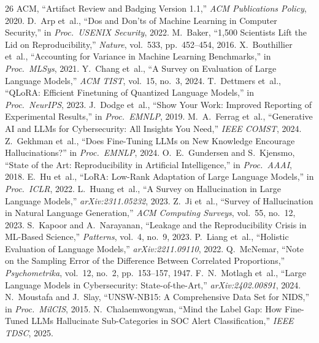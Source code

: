 \documentclass[review,3p]{elsarticle}
\begin{document}
\begin{thebibliography}{26}
 ACM, ``Artifact Review and Badging Version 1.1,'' \emph{ACM Publications Policy}, 2020.
 D.~Arp et~al., ``Dos and Don'ts of Machine Learning in Computer Security,'' in \emph{Proc.\ USENIX Security}, 2022.
 M.~Baker, ``1,500 Scientists Lift the Lid on Reproducibility,'' \emph{Nature}, vol.~533, pp.~452--454, 2016.
 X.~Bouthillier et~al., ``Accounting for Variance in Machine Learning Benchmarks,'' in \emph{Proc.\ MLSys}, 2021.
 Y.~Chang et~al., ``A Survey on Evaluation of Large Language Models,'' \emph{ACM TIST}, vol.~15, no.~3, 2024.
 T.~Dettmers et~al., ``QLoRA: Efficient Finetuning of Quantized Language Models,'' in \emph{Proc.\ NeurIPS}, 2023.
 J.~Dodge et~al., ``Show Your Work: Improved Reporting of Experimental Results,'' in \emph{Proc.\ EMNLP}, 2019.
 M.~A.~Ferrag et~al., ``Generative AI and LLMs for Cybersecurity: All Insights You Need,'' \emph{IEEE COMST}, 2024.
 Z.~Gekhman et~al., ``Does Fine-Tuning LLMs on New Knowledge Encourage Hallucinations?'' in \emph{Proc.\ EMNLP}, 2024.
 O.~E.~Gundersen and S.~Kjensmo, ``State of the Art: Reproducibility in Artificial Intelligence,'' in \emph{Proc.\ AAAI}, 2018.
 E.~Hu et~al., ``LoRA: Low-Rank Adaptation of Large Language Models,'' in \emph{Proc.\ ICLR}, 2022.
 L.~Huang et~al., ``A Survey on Hallucination in Large Language Models,'' \emph{arXiv:2311.05232}, 2023.
 Z.~Ji et~al., ``Survey of Hallucination in Natural Language Generation,'' \emph{ACM Computing Surveys}, vol.~55, no.~12, 2023.
 S.~Kapoor and A.~Narayanan, ``Leakage and the Reproducibility Crisis in ML-Based Science,'' \emph{Patterns}, vol.~4, no.~9, 2023.
 P.~Liang et~al., ``Holistic Evaluation of Language Models,'' \emph{arXiv:2211.09110}, 2022.
 Q.~McNemar, ``Note on the Sampling Error of the Difference Between Correlated Proportions,'' \emph{Psychometrika}, vol.~12, no.~2, pp.~153--157, 1947.
 F.~N.~Motlagh et~al., ``Large Language Models in Cybersecurity: State-of-the-Art,'' \emph{arXiv:2402.00891}, 2024.
 N.~Moustafa and J.~Slay, ``UNSW-NB15: A Comprehensive Data Set for NIDS,'' in \emph{Proc.\ MilCIS}, 2015.
 N.~Chalaemwongwan, ``Mind the Label Gap: How Fine-Tuned LLMs Hallucinate Sub-Categories in SOC Alert Classification,'' \emph{IEEE TDSC}, 2025.

\end{thebibliography}
\end{document}
